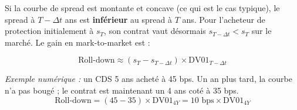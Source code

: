 Si la courbe de spread est montante et concave (ce qui est le cas typique), le spread à $T - \Delta t$ ans est \textbf{inférieur} au spread à $T$ ans. Pour l'acheteur de protection initialement à $s_T$, son contrat vaut désormais $s_{T-\Delta t} < s_T$ sur le marché. Le gain en mark-to-market est :

\begin{tcolorbox}[colback=blue!5,colframe=blue!40,title=Formule du Roll-down]
\[
\text{Roll-down} \approx (s_T - s_{T-\Delta t}) \times \text{DV01}_{T - \Delta t}
\]
\end{tcolorbox}

\textit{Exemple numérique :} un CDS 5 ans acheté à 45 bps. Un an plus tard, la courbe n'a pas bougé ; le contrat est maintenant un 4 ans coté à 35 bps.
\[
\text{Roll-down} = (45 - 35) \times \text{DV01}_{4Y} = 10 \text{ bps} \times \text{DV01}_{4Y}
\]

